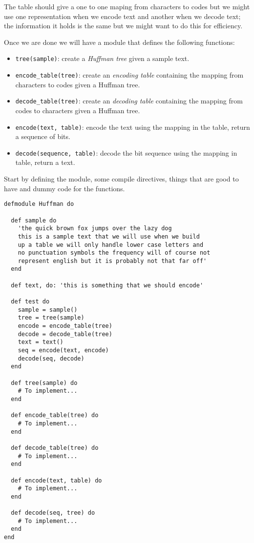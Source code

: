 \documentclass[a4paper,11pt]{article}
\begin{document}
The table should give a one to one maping from characters to codes but
we might use one representation when we encode text and another when
we decode text; the information it holds is the same but we might want
to do this for efficiency.

Once we are done we will have a module that defines the following functions:
\begin{itemize}
    \item {\tt tree(sample)}: create a {\em Huffman tree} given a sample text.
    \item {\tt encode\_table(tree)}: create an {\em encoding table} containing the mapping from characters to codes given a Huffman tree.
    \item {\tt decode\_table(tree)}: create an {\em decoding table} containing the mapping from codes to characters given a Huffman tree.
    \item {\tt encode(text, table)}: encode the text using the mapping in the table, return a sequence of bits.
    \item {\tt decode(sequence, table)}: decode the bit sequence using the mapping in table, return a text.
\end{itemize}

Start by defining the module, some compile directives, things that
are good to have and dummy code for the functions.
\begin{verbatim}
defmodule Huffman do

  def sample do
    'the quick brown fox jumps over the lazy dog
    this is a sample text that we will use when we build
    up a table we will only handle lower case letters and
    no punctuation symbols the frequency will of course not
    represent english but it is probably not that far off'
  end

  def text, do: 'this is something that we should encode'
  
  def test do
    sample = sample()
    tree = tree(sample)
    encode = encode_table(tree)
    decode = decode_table(tree)
    text = text()
    seq = encode(text, encode)
    decode(seq, decode)
  end
  
  def tree(sample) do
    # To implement...
  end
  
  def encode_table(tree) do
    # To implement...
  end
  
  def decode_table(tree) do
    # To implement...
  end
  
  def encode(text, table) do
    # To implement...
  end
  
  def decode(seq, tree) do
    # To implement...
  end
end
\end{verbatim}
\end{document}
